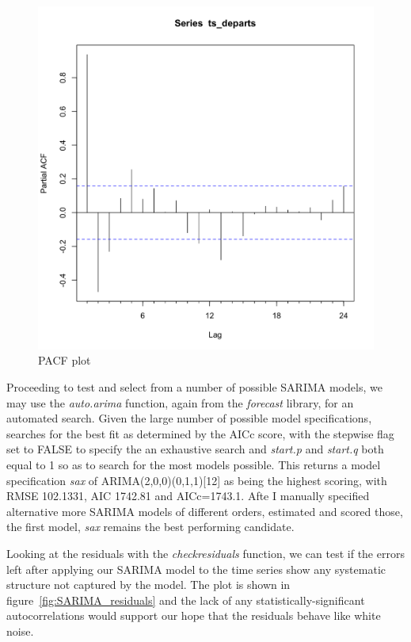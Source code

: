 \documentclass[9pt,technote]{IEEEtran}
\begin{document}
\begin{figure}[htbp]
\centerline{\includegraphics[scale=0.25]{Pacf.png}}
\caption{PACF plot}
\label{fig:Pacf}
\end{figure}

Proceeding to test and select from a number of possible SARIMA models, we may use the \textit{auto.arima} function, again from the \textit{forecast} library, for an automated search.  Given the large number of possible model specifications, searches for the best fit as determined by the AICc score, with the stepwise flag set to FALSE to specify the an exhaustive search and \textit{start.p} and \textit{start.q} both equal to 1 so as to search for the most models possible.  This returns a model specification \textit{sax} of ARIMA(2,0,0)(0,1,1)[12] as being the highest scoring, with RMSE 102.1331, AIC 1742.81 and AICc=1743.1.  Afte I manually specified alternative more SARIMA models of different orders, estimated and scored those, the first model, \textit{sax} remains the best performing candidate.  

Looking at the residuals with the \textit{checkresiduals} function, we can test if the errors left after applying our SARIMA model to the time series show any systematic structure not captured by the model.  The plot is shown in figure~\ref{fig:SARIMA_residuals} and the lack of any statistically-significant autocorrelations would support our hope that the residuals behave like white noise. 
\end{document}
